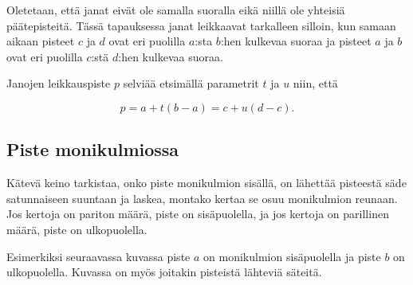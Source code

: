 Oletetaan, että janat eivät ole samalla suoralla
eikä niillä ole yhteisiä päätepisteitä.
Tässä tapauksessa janat leikkaavat
tarkalleen silloin, kun samaan aikaan
pisteet $c$ ja $d$ ovat eri puolilla
$a$:sta $b$:hen kulkevaa suoraa
ja pisteet $a$ ja $b$
ovat eri puolilla 
$c$:stä $d$:hen kulkevaa suoraa.

Janojen leikkauspiste $p$ selviää etsimällä
parametrit $t$ ja $u$ niin, että

\[ p = a+t(b-a) = c+u(d-c). \]

\subsection{Piste monikulmiossa}

Kätevä keino tarkistaa,
onko piste monikulmion sisällä,
on lähettää pisteestä säde
satunnaiseen suuntaan ja laskea,
montako kertaa se osuu monikulmion reunaan.
Jos kertoja on pariton määrä,
piste on sisäpuolella,
ja jos kertoja on parillinen määrä,
piste on ulkopuolella.
% 
% 
% 
% 

Esimerkiksi seuraavassa kuvassa piste $a$ on monikulmion
sisäpuolella ja piste $b$ on ulkopuolella.
Kuvassa on myös joitakin pisteistä lähteviä säteitä.
\\
\begin{center}
\end{center}

